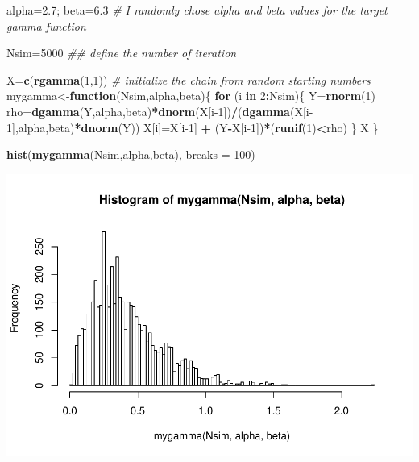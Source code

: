 \documentclass[]{book}
\newenvironment{Shaded}{\begin{snugshade}}{\end{snugshade}}
\newcommand{\CommentTok}[1]{\textcolor[rgb]{0.56,0.35,0.01}{\textit{#1}}}
\newcommand{\ControlFlowTok}[1]{\textcolor[rgb]{0.13,0.29,0.53}{\textbf{#1}}}
\newcommand{\DataTypeTok}[1]{\textcolor[rgb]{0.13,0.29,0.53}{#1}}
\newcommand{\DecValTok}[1]{\textcolor[rgb]{0.00,0.00,0.81}{#1}}
\newcommand{\FloatTok}[1]{\textcolor[rgb]{0.00,0.00,0.81}{#1}}
\newcommand{\KeywordTok}[1]{\textcolor[rgb]{0.13,0.29,0.53}{\textbf{#1}}}
\newcommand{\NormalTok}[1]{#1}
\newcommand{\OperatorTok}[1]{\textcolor[rgb]{0.81,0.36,0.00}{\textbf{#1}}}
\newcommand{\StringTok}[1]{\textcolor[rgb]{0.31,0.60,0.02}{#1}}
\begin{document}
\begin{Shaded}
\begin{Highlighting}[]
\NormalTok{alpha=}\FloatTok{2.7}\NormalTok{; beta=}\FloatTok{6.3} \CommentTok{# I randomly chose alpha and beta values for the target gamma function}

\NormalTok{Nsim=}\DecValTok{5000}  \CommentTok{## define the number of iteration }

\NormalTok{X=}\KeywordTok{c}\NormalTok{(}\KeywordTok{rgamma}\NormalTok{(}\DecValTok{1}\NormalTok{,}\DecValTok{1}\NormalTok{)) }\CommentTok{# initialize the chain from random starting numbers}
\NormalTok{mygamma<-}\ControlFlowTok{function}\NormalTok{(Nsim,alpha,beta)\{}
\ControlFlowTok{for}\NormalTok{ (i }\ControlFlowTok{in} \DecValTok{2}\OperatorTok{:}\NormalTok{Nsim)\{}
\NormalTok{  Y=}\KeywordTok{rnorm}\NormalTok{(}\DecValTok{1}\NormalTok{)}
\NormalTok{  rho=}\KeywordTok{dgamma}\NormalTok{(Y,alpha,beta)}\OperatorTok{*}\KeywordTok{dnorm}\NormalTok{(X[i}\DecValTok{-1}\NormalTok{])}\OperatorTok{/}\NormalTok{(}\KeywordTok{dgamma}\NormalTok{(X[i}\DecValTok{-1}\NormalTok{],alpha,beta)}\OperatorTok{*}\KeywordTok{dnorm}\NormalTok{(Y))}
\NormalTok{  X[i]=X[i}\DecValTok{-1}\NormalTok{] }\OperatorTok{+}\StringTok{ }\NormalTok{(Y}\OperatorTok{-}\NormalTok{X[i}\DecValTok{-1}\NormalTok{])}\OperatorTok{*}\NormalTok{(}\KeywordTok{runif}\NormalTok{(}\DecValTok{1}\NormalTok{)}\OperatorTok{<}\NormalTok{rho)}
\NormalTok{\}}
\NormalTok{X}
\NormalTok{\}}

\KeywordTok{hist}\NormalTok{(}\KeywordTok{mygamma}\NormalTok{(Nsim,alpha,beta), }\DataTypeTok{breaks =} \DecValTok{100}\NormalTok{)}
\end{Highlighting}
\end{Shaded}

\includegraphics{bookdown-demo_files/figure-latex/unnamed-chunk-26-1.pdf}
\end{document}
